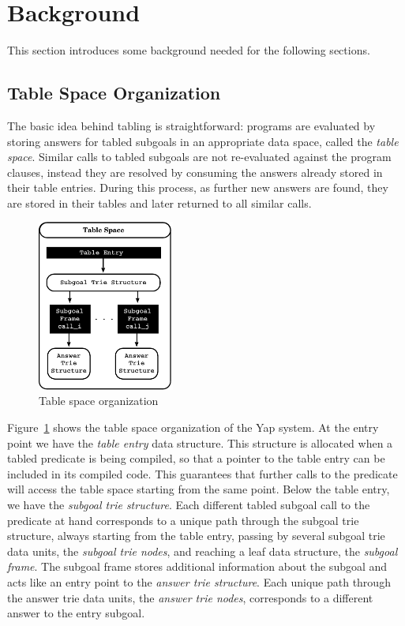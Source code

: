 \documentclass{llncs}
\begin{document}
\section{Background}

This section introduces some background needed for the following
sections. 


\subsection{Table Space Organization}

The basic idea behind tabling is straightforward: programs are
evaluated by storing answers for tabled subgoals in an appropriate
data space, called the \emph{table space}. Similar calls to tabled
subgoals are not re-evaluated against the program clauses, instead
they are resolved by consuming the answers already stored in their
table entries. During this process, as further new answers are found,
they are stored in their tables and later returned to all similar
calls.

\begin{figure}
\centering
\includegraphics[width=4.5cm]{figures/table-space.pdf}
\caption{Table space organization}
\label{fig_table_space}
\end{figure}

Figure~\ref{fig_table_space} shows the table space organization of the
Yap system. At the entry point we have the \emph{table entry} data
structure. This structure is allocated when a tabled predicate is
being compiled, so that a pointer to the table entry can be included
in its compiled code. This guarantees that further calls to the
predicate will access the table space starting from the same
point. Below the table entry, we have the \emph{subgoal trie
  structure}. Each different tabled subgoal call to the predicate at
hand corresponds to a unique path through the subgoal trie structure,
always starting from the table entry, passing by several subgoal trie
data units, the \emph{subgoal trie nodes}, and reaching a leaf data
structure, the \emph{subgoal frame}. The subgoal frame stores
additional information about the subgoal and acts like an entry point
to the \emph{answer trie structure}. Each unique path through the
answer trie data units, the \emph{answer trie nodes}, corresponds to a
different answer to the entry subgoal.
\end{document}
